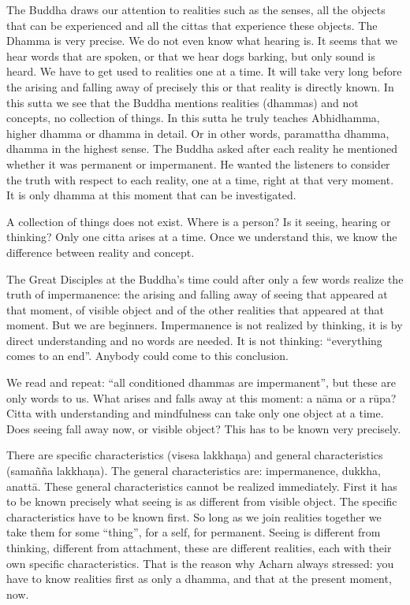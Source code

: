 The Buddha draws our attention to realities such as the senses, all the
objects that can be experienced and all the cittas that experience these
objects. The Dhamma is very precise. We do not even know what hearing
is. It seems that we hear words that are spoken, or that we hear dogs
barking, but only sound is heard. We have to get used to realities one
at a time. It will take very long before the arising and falling away of
precisely this or that reality is directly known. In this sutta we see
that the Buddha mentions realities (dhammas) and not concepts, no
collection of things. In this sutta he truly teaches Abhidhamma, higher
dhamma or dhamma in detail. Or in other words, paramattha dhamma, dhamma
in the highest sense. The Buddha asked after each reality he mentioned
whether it was permanent or impermanent. He wanted the listeners to
consider the truth with respect to each reality, one at a time, right at
that very moment. It is only dhamma at this moment that can be
investigated.

A collection of things does not exist. Where is a person? Is it seeing,
hearing or thinking? Only one citta arises at a time. Once we understand
this, we know the difference between reality and concept.

The Great Disciples at the Buddha's time could after only a few words
realize the truth of impermanence: the arising and falling away of
seeing that appeared at that moment, of visible object and of the other
realities that appeared at that moment. But we are beginners.
Impermanence is not realized by thinking, it is by direct understanding
and no words are needed. It is not thinking: ``everything comes to an
end''. Anybody could come to this conclusion.

We read and repeat: ``all conditioned dhammas are impermanent'', but
these are only words to us. What arises and falls away at this moment: a
nāma or a rūpa? Citta with understanding and mindfulness can take only
one object at a time. Does seeing fall away now, or visible object? This
has to be known very precisely.

There are specific characteristics (visesa lakkhaṇa) and general
characteristics (samañña lakkhaṇa). The general characteristics are:
impermanence, dukkha, anattā. These general characteristics cannot be
realized immediately. First it has to be known precisely what seeing is
as different from visible object. The specific characteristics have to
be known first. So long as we join realities together we take them for
some ``thing'', for a self, for permanent. Seeing is different from
thinking, different from attachment, these are different realities, each
with their own specific characteristics. That is the reason why Acharn
always stressed: you have to know realities first as only a dhamma, and
that at the present moment, now.

